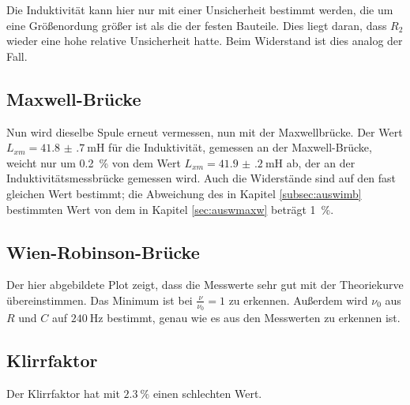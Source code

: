 Die Induktivität kann hier nur mit einer Unsicherheit bestimmt werden, die
um eine Größenordung größer ist als die der festen Bauteile. Dies liegt daran, dass
$R_2$ wieder eine hohe relative Unsicherheit hatte. Beim Widerstand ist dies analog
der Fall.

\subsection{Maxwell-Brücke}

Nun wird dieselbe Spule erneut vermessen, nun mit der Maxwellbrücke. Der Wert
$L_{xm} = \SI{41.8(7)}{\milli\henry}$ für
die Induktivität, gemessen an der Maxwell-Brücke, weicht nur um \SI{0.2}{\percent}
von dem Wert $L_{xm} = \SI{41.9(2)}{\milli\henry}$ ab, der an der
Induktivitätsmessbrücke gemessen wird. Auch die Widerstände sind auf den fast gleichen Wert
bestimmt; die Abweichung des in Kapitel \ref{subsec:auswimb} bestimmten Wert von dem
in Kapitel \ref{sec:auswmaxw} beträgt \SI{1}{\percent}.

\subsection{Wien-Robinson-Brücke}

Der hier abgebildete Plot zeigt, dass die Messwerte sehr gut mit der Theoriekurve
übereinstimmen. Das Minimum ist bei $\frac{\nu}{\nu_0} = 1$ zu erkennen.
Außerdem wird $\nu_0$ aus $R$ und $C$ auf $\SI{240}{\hertz}$ bestimmt, genau wie
es aus den Messwerten zu erkennen ist.

\subsection{Klirrfaktor}

Der Klirrfaktor hat mit $\SI{2.3}{\percent}$ einen schlechten Wert.
